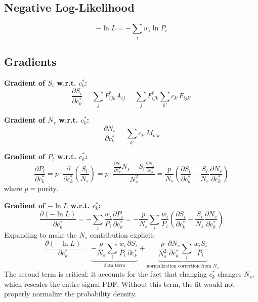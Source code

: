 \documentclass[11pt,a4paper]{article}
\begin{document}
\subsection{Negative Log-Likelihood}
\begin{equation}
-\ln L = -\sum_i w_i \ln P_i
\end{equation}

\subsection{Gradients}

\textbf{Gradient of $S_i$ w.r.t. $c_k^*$:}
\begin{equation}
\frac{\partial S_i}{\partial c_k^*} = \sum_{j} F_{ijk}^* A_{ij} = \sum_{j} F_{ijk}^* \sum_{k'} c_{k'} F_{ijk'}
\end{equation}

\textbf{Gradient of $N_s$ w.r.t. $c_k^*$:}
\begin{equation}
\frac{\partial N_s}{\partial c_k^*} = \sum_{k'} c_{k'} M_{k'k}
\end{equation}

\textbf{Gradient of $P_i$ w.r.t. $c_k^*$:}
\begin{equation}
\frac{\partial P_i}{\partial c_k^*} = p \cdot \frac{\partial}{\partial c_k^*}\left(\frac{S_i}{N_s}\right) = p \cdot \frac{\frac{\partial S_i}{\partial c_k^*} N_s - S_i \frac{\partial N_s}{\partial c_k^*}}{N_s^2} = \frac{p}{N_s}\left(\frac{\partial S_i}{\partial c_k^*} - \frac{S_i}{N_s} \frac{\partial N_s}{\partial c_k^*}\right)
\end{equation}
where $p = \text{purity}$.

\textbf{Gradient of $-\ln L$ w.r.t. $c_k^*$:}
\begin{equation}
\frac{\partial(-\ln L)}{\partial c_k^*} = -\sum_i \frac{w_i}{P_i} \frac{\partial P_i}{\partial c_k^*} = -\frac{p}{N_s} \sum_i \frac{w_i}{P_i} \left(\frac{\partial S_i}{\partial c_k^*} - \frac{S_i}{N_s} \frac{\partial N_s}{\partial c_k^*}\right)
\end{equation}
Expanding to make the $N_s$ contribution explicit:
\begin{equation}
\frac{\partial(-\ln L)}{\partial c_k^*} = \underbrace{-\frac{p}{N_s} \sum_i \frac{w_i}{P_i} \frac{\partial S_i}{\partial c_k^*}}_{\text{data term}} + \underbrace{\frac{p}{N_s^2} \frac{\partial N_s}{\partial c_k^*} \sum_i \frac{w_i S_i}{P_i}}_{\text{normalization correction from } N_s}
\end{equation}
The second term is critical: it accounts for the fact that changing $c_k^*$ changes $N_s$, which rescales the entire signal PDF. Without this term, the fit would not properly normalize the probability density.
\end{document}
